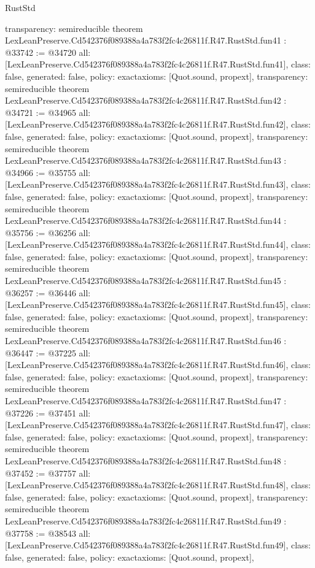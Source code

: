 \begin{lexlean}{RustStd}
\begin{coremodule}
{  transparency: semireducible
}
theorem LexLeanPreserve.Cd542376f089388a4a783f2fc4c26811f.R47.RustStd.fun41 : @33742 := @34720 {
  all: [LexLeanPreserve.Cd542376f089388a4a783f2fc4c26811f.R47.RustStd.fun41],
  class: false,
  generated: false,
  policy: exact{axioms: [Quot.sound, propext]},
  transparency: semireducible
}
theorem LexLeanPreserve.Cd542376f089388a4a783f2fc4c26811f.R47.RustStd.fun42 : @34721 := @34965 {
  all: [LexLeanPreserve.Cd542376f089388a4a783f2fc4c26811f.R47.RustStd.fun42],
  class: false,
  generated: false,
  policy: exact{axioms: [Quot.sound, propext]},
  transparency: semireducible
}
theorem LexLeanPreserve.Cd542376f089388a4a783f2fc4c26811f.R47.RustStd.fun43 : @34966 := @35755 {
  all: [LexLeanPreserve.Cd542376f089388a4a783f2fc4c26811f.R47.RustStd.fun43],
  class: false,
  generated: false,
  policy: exact{axioms: [Quot.sound, propext]},
  transparency: semireducible
}
theorem LexLeanPreserve.Cd542376f089388a4a783f2fc4c26811f.R47.RustStd.fun44 : @35756 := @36256 {
  all: [LexLeanPreserve.Cd542376f089388a4a783f2fc4c26811f.R47.RustStd.fun44],
  class: false,
  generated: false,
  policy: exact{axioms: [Quot.sound, propext]},
  transparency: semireducible
}
theorem LexLeanPreserve.Cd542376f089388a4a783f2fc4c26811f.R47.RustStd.fun45 : @36257 := @36446 {
  all: [LexLeanPreserve.Cd542376f089388a4a783f2fc4c26811f.R47.RustStd.fun45],
  class: false,
  generated: false,
  policy: exact{axioms: [Quot.sound, propext]},
  transparency: semireducible
}
theorem LexLeanPreserve.Cd542376f089388a4a783f2fc4c26811f.R47.RustStd.fun46 : @36447 := @37225 {
  all: [LexLeanPreserve.Cd542376f089388a4a783f2fc4c26811f.R47.RustStd.fun46],
  class: false,
  generated: false,
  policy: exact{axioms: [Quot.sound, propext]},
  transparency: semireducible
}
theorem LexLeanPreserve.Cd542376f089388a4a783f2fc4c26811f.R47.RustStd.fun47 : @37226 := @37451 {
  all: [LexLeanPreserve.Cd542376f089388a4a783f2fc4c26811f.R47.RustStd.fun47],
  class: false,
  generated: false,
  policy: exact{axioms: [Quot.sound, propext]},
  transparency: semireducible
}
theorem LexLeanPreserve.Cd542376f089388a4a783f2fc4c26811f.R47.RustStd.fun48 : @37452 := @37757 {
  all: [LexLeanPreserve.Cd542376f089388a4a783f2fc4c26811f.R47.RustStd.fun48],
  class: false,
  generated: false,
  policy: exact{axioms: [Quot.sound, propext]},
  transparency: semireducible
}
theorem LexLeanPreserve.Cd542376f089388a4a783f2fc4c26811f.R47.RustStd.fun49 : @37758 := @38543 {
  all: [LexLeanPreserve.Cd542376f089388a4a783f2fc4c26811f.R47.RustStd.fun49],
  class: false,
  generated: false,
  policy: exact{axioms: [Quot.sound, propext]},
}
\end{coremodule}
\end{lexlean}
